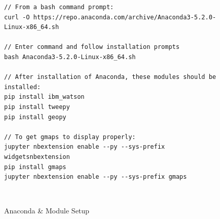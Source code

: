 \documentclass[12pt, oneside]{article}
\begin{document}
\begin{figure}[H]
\begin{lstlisting}
// From a bash command prompt:
curl -O https://repo.anaconda.com/archive/Anaconda3-5.2.0-Linux-x86_64.sh

// Enter command and follow installation prompts
bash Anaconda3-5.2.0-Linux-x86_64.sh

// After installation of Anaconda, these modules should be installed:
pip install ibm_watson
pip install tweepy
pip install geopy

// To get gmaps to display properly:
jupyter nbextension enable --py --sys-prefix widgetsnbextension
pip install gmaps
jupyter nbextension enable --py --sys-prefix gmaps

\end{lstlisting}
\caption{Anaconda \& Module Setup}\
\label{fig:code}
\end{figure}
\end{document}
